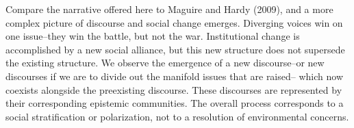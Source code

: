 \documentclass{article}
\begin{document}
	Compare the narrative offered here to Maguire and Hardy (2009), and a more complex picture of discourse and social change emerges. Diverging voices win on one issue--they win the battle, but not the war. Institutional change is accomplished by a new social alliance, but this new structure does not supersede the existing structure. We observe the emergence of a new discourse--or new discourses if we are to divide out the manifold issues that are raised-- which now coexists alongside the preexisting discourse. These discourses are represented by their corresponding epistemic communities. The overall process corresponds to a social stratification or polarization, not to a resolution of environmental concerns.
\end{document}
